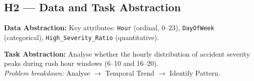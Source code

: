 \subsection{H2 — Data and Task Abstraction}

\textbf{Data Abstraction:}
Key attributes: \texttt{Hour} (ordinal, 0--23), \texttt{DayOfWeek} (categorical),
\texttt{High\_Severity\_Ratio} (quantitative).

\textbf{Task Abstraction:}
Analyse whether the hourly distribution of accident severity peaks during rush
hour windows (6--10 and 16--20).\\
\textit{Problem breakdown:} Analyse $\rightarrow$ Temporal Trend $\rightarrow$
Identify Pattern.
